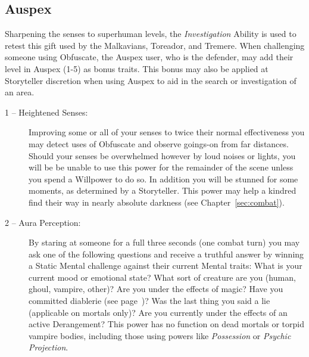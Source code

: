 \subsection{Auspex}
Sharpening the senses to superhuman levels, the \emph{Investigation} Ability 
is used to retest this gift used by the Malkavians, Toreador, and Tremere.  When 
challenging someone using Obfuscate, the Auspex user, who is the defender, 
may add their level in Auspex (1-5) as bonus traits.  This bonus may also be applied at 
Storyteller discretion when using Auspex to aid in the search or investigation of an area.

\begin{description}
	\item[1 -- Heightened Senses:]  Improving some or all of your senses to 
	twice their normal effectiveness you may detect uses of Obfuscate and 
	observe goings-on from far distances.  Should your senses be overwhelmed 
	however by loud noises or lights, you will be be unable to use this power 
	for the remainder of the scene unless you spend a Willpower to do so.  In addition 
	you will be stunned for some moments, as determined by a Storyteller.  This power 
	may help a kindred find their way in nearly absolute darkness (see Chapter~\ref{sec:combat}).
	\item [2 -- Aura Perception:]  By staring at someone for a full three seconds 
	(one combat turn) you may ask one of the following questions and receive a 
	truthful answer by winning a Static Mental challenge against their current Mental 
	traits:  What is your current mood or emotional state?  What sort of creature are 
	you (human, ghoul, vampire, other)?  Are you under the effects of magic?  
	Have you committed diablerie (see page~\pageref{sec:additional})?  Was the last thing 
	you said a lie (applicable on mortals only)?  Are you currently under the effects of 
	an active Derangement?  This power has no function on dead mortals or torpid vampire 
	bodies, including those using  powers like \emph{Possession} or \emph{Psychic Projection}.
	

\end{description}
